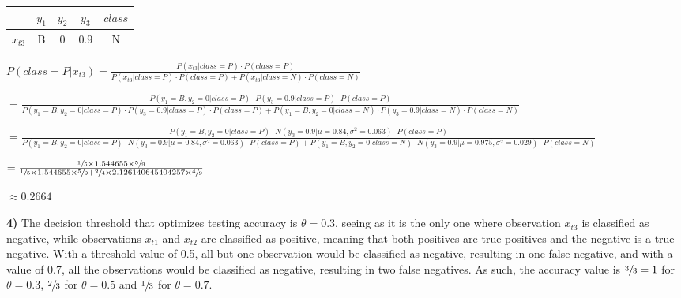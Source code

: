 \documentclass[11pt,a4paper]{article}
\begin{document}
\begin{flushleft}
  \vspace{6mm}\begin{tabular}{c|c|c|c|c|}
    \cline{2-5}
                                   & $y_1$ & $y_2$ & $y_3$ & $class$ \\ \hline
    \multicolumn{1}{|c|}{$x_{t3}$} & B     & 0     & 0.9   & N       \\ \hline
  \end{tabular} \par
  \vspace{3.5mm}\small $ P(class = P | x_{t3}) = \frac{P(x_{t3} | class = P) \cdot P(class = P)}{P(x_{t3} | class = P) \cdot P(class = P) + P(x_{t3} | class = N) \cdot P(class = N)} $ \par
  \vspace{2mm}\footnotesize $ = \frac{P(y_1 = B, y_2 = 0 | class = P) \cdot P(y_3 = 0.9 | class = P) \cdot P(class = P)}{{P(y_1 = B, y_2 = 0 | class = P) \cdot P(y_3 = 0.9 | class = P) \cdot P(class = P) + P(y_1 = B, y_2 = 0 | class = N) \cdot P(y_3 = 0.9 | class = N) \cdot P(class = N)}} $ \par
  \vspace{2mm}\footnotesize $ = \frac{P(y_1 = B, y_2 = 0 | class = P) \cdot N(y_3 = 0.9 | \mu = 0.84, \sigma^2 = 0.063) \cdot P(class = P)}{P(y_1 = B, y_2 = 0 | class = P) \cdot N(y_3 = 0.9 | \mu = 0.84, \sigma^2 = 0.063) \cdot P(class = P) + P(y_1 = B, y_2 = 0 | class = N) \cdot N(y_3 = 0.9 | \mu = 0.975, \sigma^2 = 0.029) \cdot P(class = N)} $ \par
  \vspace{2mm}\small $ = \frac{\sfrac{1}{5} \times 1.544655 \times \sfrac{5}{9}}{\sfrac{1}{5} \times 1.544655 \times \sfrac{5}{9} + \sfrac{2}{4} \times 2.126140645404257 \times \sfrac{4}{9}} $ \par
  \vspace{2.5mm}\small $ \approx 0.2664 $ \par
\end{flushleft}
\normalsize

\begin{flushleft}\vspace{2mm}
  \textbf{4)}
  The decision threshold that optimizes testing accuracy is $\theta = 0.3$, seeing as it is the only one where observation $x_{t3}$ is classified as negative, while observations $x_{t1}$ and $x_{t2}$ are classified as positive, meaning that both positives are true positives and the negative is a true negative. With a threshold value of 0.5, all but one observation would be classified as negative, resulting in one false negative, and with a value of 0.7, all the observations would be classified as negative, resulting in two false negatives. As such, the accuracy value is $\sfrac{3}{3} = 1$ for $\theta = 0.3$, $\sfrac{2}{3}$ for $\theta = 0.5$ and $\sfrac{1}{3}$ for $\theta = 0.7$.
\end{flushleft}
\end{document}

